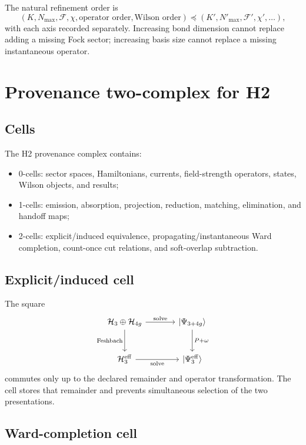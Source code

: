 \documentclass[11pt]{article}
\newcommand{\Hil}{\mathcal H}
\newcommand{\cF}{\mathcal F}
\newcommand{\eff}{\mathrm{eff}}
\begin{document}
The natural refinement order is
\begin{equation}
 (K,N_{\max},\cF,\chi,\text{operator order},\text{Wilson order})
 \preceq
 (K',N'_{\max},\cF',\chi',\ldots),
\end{equation}
with each axis recorded separately.  Increasing bond dimension cannot replace
adding a missing Fock sector; increasing basis size cannot replace a missing
instantaneous operator.

\section{Provenance two-complex for H2}

\subsection{Cells}

The H2 provenance complex contains:
\begin{itemize}
 \item 0-cells: sector spaces, Hamiltonians, currents, field-strength
 operators, states, Wilson objects, and results;
 \item 1-cells: emission, absorption, projection, reduction, matching,
 elimination, and handoff maps;
 \item 2-cells: explicit/induced equivalence, propagating/instantaneous Ward
 completion, count-once cut relations, and soft-overlap subtraction.
\end{itemize}

\subsection{Explicit/induced cell}

The square
\begin{equation}
\begin{tikzcd}[column sep=large,row sep=large]
 \Hil_{3}\oplus\Hil_{4g}
 \arrow[r,"\text{solve}"]
 \arrow[d,"\text{Feshbach}"']
 & {\lvert\Psi_{3+4g}\rangle}
 \arrow[d,"P+\omega"]\\
 \Hil_{3}^{\eff}
 \arrow[r,"\text{solve}"']
 & {\lvert\Psi_{3}^{\eff}\rangle}
\end{tikzcd}
\end{equation}
commutes only up to the declared remainder and operator transformation.  The
cell stores that remainder and prevents simultaneous selection of the two
presentations.

\subsection{Ward-completion cell}
\end{document}
